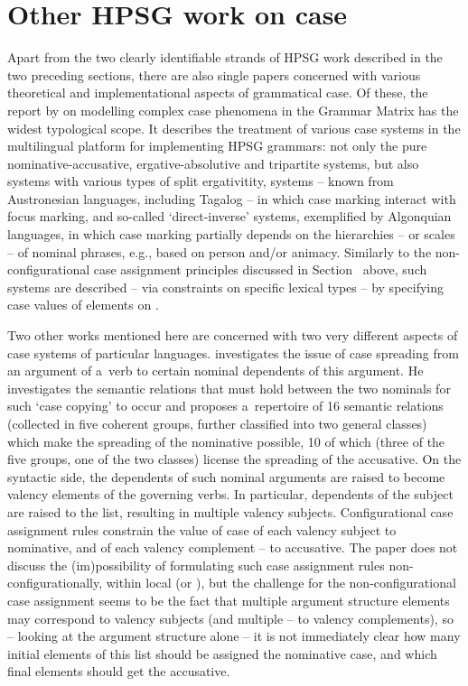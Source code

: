 \documentclass[output=paper]{langsci/langscibook}
\begin{document}
\section{Other HPSG work on case}
\label{sec:case:other}

Apart from the two clearly identifiable strands of HPSG work described in the two preceding sections, there are also single papers concerned with various theoretical and implementational aspects of grammatical case.  Of these, the report by \citealt{drel:08} on modelling complex case phenomena in the Grammar Matrix \citep{BFO2002a-u} has the widest typological scope.  It describes the treatment of various case systems in the multilingual platform for implementing HPSG grammars: not only the pure nominative-accusative, ergative-absolutive and tripartite systems, but also systems with various types of split ergativitity, systems – known from Austronesian languages, including Tagalog – in which case marking interact with focus marking, and so-called `direct-inverse’ systems, exemplified by Algonquian languages, in which case marking partially depends on the hierarchies – or scales – of nominal phrases, e.g., based on person and/or animacy.  Similarly to the non-configurational case assignment principles discussed in Section~ above, such systems are described – via constraints on specific lexical types – by specifying case values of elements on .

Two other works mentioned here are concerned with two very different aspects of case systems of particular languages.  \citealt{ryu:13} investigates the issue of case spreading from an argument of a~verb to certain nominal dependents of this argument.  He investigates the semantic relations that must hold between the two nominals for such `case copying’ to occur and proposes a~repertoire of 16 semantic relations (collected in five coherent groups, further classified into two general classes) which make the spreading of the nominative possible, 10 of which (three of the five groups, one of the two classes) license the spreading of the accusative.  On the syntactic side, the dependents of such nominal arguments are raised to become valency elements of the governing verbs.  In particular, dependents of the subject are raised to the  list, resulting in multiple valency subjects.  Configurational case assignment rules constrain the value of case of each valency subject to nominative, and of each valency complement – to accusative.  The paper does not discuss the (im)possibility of formulating such case assignment rules non-configurationally, within local  (or ), but the challenge for the non-configurational case assignment seems to be the fact that multiple argument structure elements may correspond to valency subjects (and multiple – to valency complements), so – looking at the argument structure alone – it is not immediately clear how many initial elements of this list should be assigned the nominative case, and which final elements should get the accusative.
\end{document}
